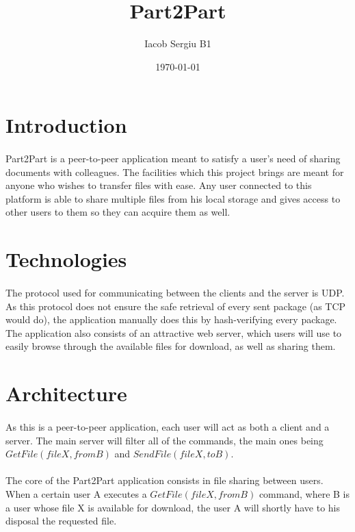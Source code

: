 \documentclass[paper=a4, fontsize=11pt]{scrartcl}
\title{Part2Part}
\author{Iacob Sergiu B1}
\date{\normalsize\today}
\begin{document}
\maketitle

\newpage

\section{Introduction}

\paragraph{}
Part2Part is a peer-to-peer application meant to satisfy a user's need of sharing documents with colleagues. The facilities which this project brings are meant for anyone who wishes to transfer files with ease.
Any user connected to this platform is able to share multiple files from his local storage and gives access to other users to them so they can acquire them as well.

\section{Technologies}
\paragraph{}
The protocol used for communicating between the clients and the server is UDP. As this protocol does not ensure the safe retrieval of every sent package (as TCP would do), the application manually does this by hash-verifying every package.
The application also consists of an attractive web server, which users will use to easily browse through the available files for download, as well as sharing them.

\section{Architecture}
\paragraph{}
As this is a peer-to-peer application, each user will act as both a client and a server. The main server will filter all of the commands, the main ones being $GetFile(file X, from B)$ and $SendFile (file X, to B)$.
\paragraph{}
The core of the Part2Part application consists in file sharing between users. When a certain user A executes a $GetFile(file X, from B)$ command, where B is a user whose file X is available for download, the user A will shortly have to his disposal the requested file. 
\end{document}
